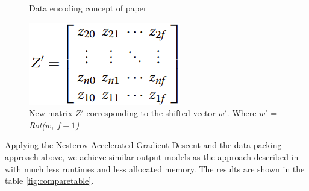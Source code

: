     \begin{figure}[ht]
	    \centering
	    \qquad
        \caption{Data encoding concept of paper \cite{Kim2018}} \label{fig:dataencodeconcept}
	\end{figure}
	
	\begin{figure}[ht]
        \centering
        \includegraphics[width=0.3\linewidth]{images/Screenshot from 2021-10-04 02-04-49.png}
        \caption{New matrix $Z'$ corresponding to the shifted vector $w'$. Where $w'$ = \textit{Rot($w$, $f+1$)} \cite{Kim2018}}
        \label{fig:shiftedw}
    \end{figure} 
    
    Applying the Nesterov Accelerated Gradient Descent \cite{Nesterov} and the data packing approach above, we achieve similar output models as the approach described in \cite{MiranKim2018} with much less runtimes and less allocated memory. The results are shown in the table \ref{fig:comparetable}.
    
